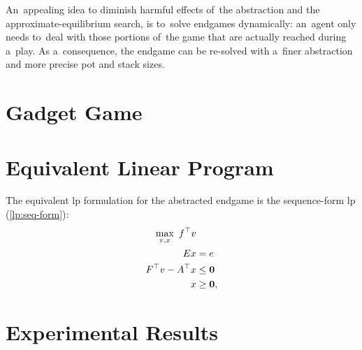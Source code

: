 An~appealing idea to diminish harmful effects of~the abstraction and the approximate-equilibrium search, is to~solve endgames dynamically:
an~agent only needs to~deal with those portions of~the game that are actually reached during a~play.
As a~consequence, the endgame can be re-solved with a~finer abstraction and more precise pot and stack sizes.
\todo

\section{Gadget Game}

\section{Equivalent Linear Program}
\todo

The equivalent \acrshort{lp} formulation for the abstracted endgame is the sequence-form \acrshort{lp} (\ref{lp:seq-form}):
\begin{equation*}
  \begin{split}
    \max_{v, x}\  f^\top v & \\
    Ex &= e \\
    F^\top v - A^\top x &\le \boldsymbol{0} \\
    x &\ge \boldsymbol{0},
  \end{split}
\end{equation*}

\section{Experimental Results}
